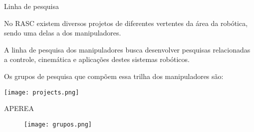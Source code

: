  \begin{frame}[t]{Linha de pesquisa} 

    No RASC existem diversos projetos de diferentes vertentes da área da robótica, sendo uma delas a dos manipuladores.

    \vspace*{0.3cm}

    A linha de pesquisa dos manipuladores busca desenvolver pesquisas relacionadas a controle, cinemática e aplicações destes sistemas robóticos.

    \vspace*{0.3cm}

    Os grupos de pesquisa que compõem essa trilha dos manipuladores são:

    \vspace*{0.8cm}
    \texttt{[image: projects.png]}
\end{frame}
\begin{frame}[t]{APEREA}
    \begin{figure}
        \texttt{[image: grupos.png]}
    \end{figure}
\end{frame}
